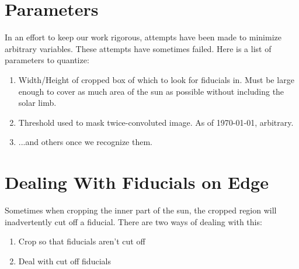 \documentclass[10pt]{scrartcl}
\begin{document}

\section{Parameters}
    In an effort to keep our work rigorous, attempts have been made to minimize arbitrary variables. These attempts have sometimes failed. Here is a list of parameters to quantize:
    \begin{enumerate}
        \item Width/Height of cropped box of which to look for fiducials in. Must be large enough to cover as much area of the sun as possible without including the solar limb.
        \item Threshold used to mask twice-convoluted image. As of \today, arbitrary.
        \item ...and others once we recognize them.
    \end{enumerate}

\section{Dealing With Fiducials on Edge} %
\label{sec:dealing_witb_fiducials_on_edge}
    Sometimes when cropping the inner part of the sun, the cropped region will inadvertently cut off a fiducial. There are two ways of dealing with this:

    \begin{enumerate}
         \item Crop so that fiducials aren't cut off
         \item Deal with cut off fiducials
     \end{enumerate} 
\end{document}
